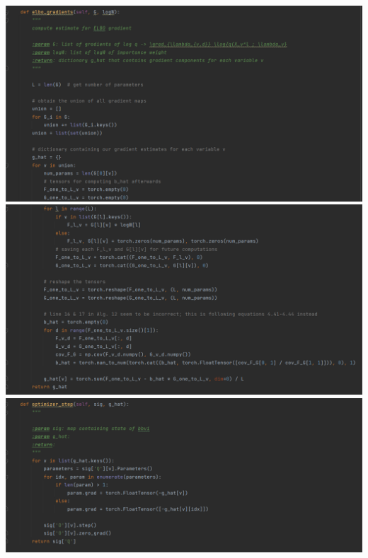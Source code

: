 \documentclass[10pt]{homeworg}
\begin{document}
\begin{center}
\includegraphics[scale=0.5]{figures/elbo_gradients_1.png}
\includegraphics[scale=0.5]{figures/elbo_gradients_2.png}
\includegraphics[scale=0.5]{figures/optimizer_step.png}
\end{center}
\end{document}
